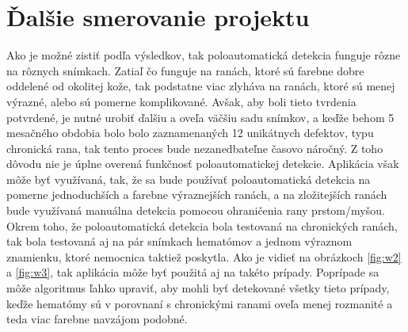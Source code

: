 \section{Ďalšie smerovanie projektu}
Ako je možné zistiť podľa výsledkov, tak poloautomatická detekcia funguje rôzne na rôznych snímkach. Zatiaľ čo funguje na ranách, ktoré sú farebne dobre oddelené od okolitej kože, tak podstatne viac zlyháva na ranách, ktoré sú menej výrazné, alebo sú pomerne komplikované. Avšak, aby boli tieto tvrdenia potvrdené, je nutné urobiť ďalšiu a oveľa väčšiu sadu snímkov, a keďže behom 5 mesačného obdobia bolo bolo zaznamenaných 12 unikátnych defektov, typu chronická rana, tak tento proces bude nezanedbateľne časovo náročný. Z toho dôvodu nie je úplne overená funkčnosť poloautomatickej detekcie. Aplikácia však môže byť využívaná, tak, že sa bude používať poloautomatická detekcia na pomerne jednoduchších a farebne výraznejších ranách, a na zložitejších ranách bude využívaná manuálna detekcia pomocou ohraničenia rany prstom/myšou. Okrem toho, že poloautomatická detekcia bola testovaná na chronických ranách, tak bola testovaná aj na pár snímkach hematómov a jednom výraznom znamienku, ktoré nemocnica taktiež poskytla. Ako je vidieť na obrázkoch \ref{fig:w2} a \ref{fig:w3}, tak aplikácia môže byť použitá aj na takéto prípady. Poprípade sa môže algoritmus ľahko upraviť, aby mohli byť detekované všetky tieto prípady, keďže hematómy sú v porovnaní s chronickými ranami oveľa menej rozmanité a teda viac farebne navzájom podobné.

